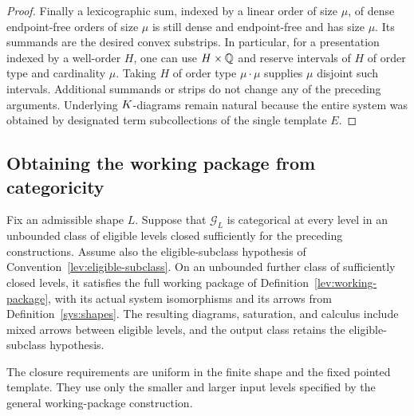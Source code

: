 \begin{proof}
Finally a lexicographic sum, indexed by a linear order of size
$\mu$, of dense endpoint-free orders of size $\mu$ is still dense
and endpoint-free and has size $\mu$.  Its summands are the desired
convex substrips.  In particular, for a presentation indexed by a
well-order $H$, one can use $H\times\mathbb Q$ and reserve intervals of
$H$ of order type and cardinality $\mu$.  Taking $H$ of order type
$\mu\cdot\mu$ supplies $\mu$ disjoint such intervals.  Additional
summands or strips do not change any of the preceding arguments.
Underlying $K$-diagrams remain natural because the entire system
was obtained by designated term subcollections of the single
template $E$.
\end{proof}

\subsection{Obtaining the working package from categoricity}

\begin{proposition}
\label{sys:working-package}
Fix an admissible shape $L$.  Suppose that $\mathcal G_L$ is
categorical at every level in an unbounded class of eligible levels
closed sufficiently for the preceding constructions.  Assume also
the eligible-subclass hypothesis of Convention~\ref{lev:eligible-subclass}.
On an unbounded further class of sufficiently closed levels, it satisfies the full working
package of Definition~\ref{lev:working-package}, with its actual
system isomorphisms and its arrows from Definition~\ref{sys:shapes}.
The resulting diagrams, saturation, and calculus include mixed
arrows between eligible levels, and the output class retains the
eligible-subclass hypothesis.

The closure requirements are uniform in the finite shape and the
fixed pointed template.  They use only the smaller and larger input
levels specified by the general working-package construction.
\end{proposition}

